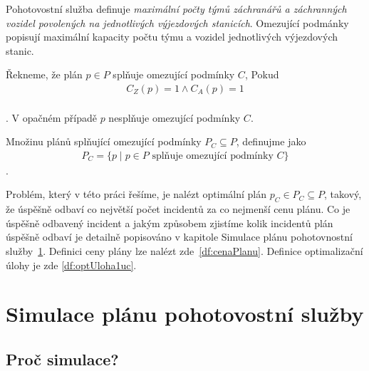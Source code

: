 Pohotovostní služba definuje \textit{maximální počty týmů záchranářů a záchranných vozidel povolených na jednotlivých výjezdových stanicích}.
Omezující podmánky popisují maximální kapacity počtu týmu a vozidel jednotlivých výjezdových stanic.

\begin{definice}
  Řekneme, že plán $p \in P$ splňuje omezující podmínky $C$, Pokud
  \begin{align*}
    C_Z(p) = 1 \land C_A(p) = 1
  \end{align*}
  \\
  . V opačném případě $p$ nesplňuje omezující podmínky $C$.
\end{definice}

\begin{definice}
  Množinu plánů splňující omezující podmínky $P_C \subseteq P$, definujme jako
  \begin{align*}
    P_C = \{ p \mid \text{$p \in P$ splňuje omezující podmínky $C$} \}
  \end{align*}
  .
  \\
\end{definice}

Problém, který v této práci řešíme, je nalézt optimální plán $p_C \in P_C \subseteq P$, takový, že úspěšně odbaví co největší počet incidentů za co nejmenší cenu plánu.
Co je úspěšně odbavený incident a jakým způsobem zjistíme kolik incidentů plán úspěšně odbaví je detailně popisováno v kapitole Simulace plánu pohotovnostní služby~\ref{SimulaceKap}.
Definici ceny plány lze nalézt zde~\ref{df:cenaPlanu}.
Definice optimalizační úlohy je zde \ref{df:optUloha1uc}.

\clearpage

\section{Simulace plánu pohotovostní služby}\label{SimulaceKap}

\subsection{Proč simulace?}\label{kap:procSimulace}

